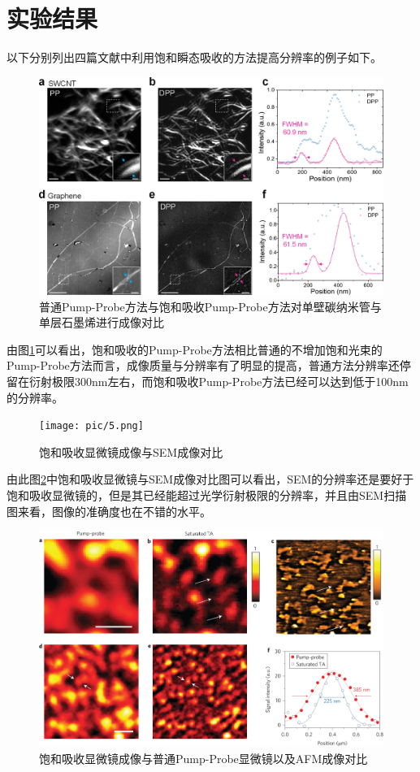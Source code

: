 \documentclass{phyasgn}\usepackage{nag}
\begin{document}
\section{实验结果}
以下分别列出四篇文献中利用饱和瞬态吸收的方法提高分辨率的例子如下。
\begin{figure}[!h]
	\centering
	\includegraphics[width=.9\linewidth]{pic/4.png}
	\caption[饱和吸收显微镜原理]{普通Pump-Probe方法与饱和吸收Pump-Probe方法对单壁碳纳米管与单层石墨烯进行成像对比\cite{doi:10.1021/acs.nanolett.1c00403}}\vspace{1ex}
	\label{4}
	\end{figure}
    \par 由图\ref{4}可以看出，饱和吸收的Pump-Probe方法相比普通的不增加饱和光束的Pump-Probe方法而言，成像质量与分辨率有了明显的提高，普通方法分辨率还停留在衍射极限300nm左右，而饱和吸收Pump-Probe方法已经可以达到低于100nm的分辨率。
\begin{figure}[!h]
	\centering
	\texttt{[image: pic/5.png]}
	\caption[饱和吸收显微镜原理]{饱和吸收显微镜成像与SEM成像对比\cite{doi:10.1021/acs.nanolett.1c00403}}\vspace{1ex}
	\label{5}
	\end{figure}
    \par 由此图\ref{5}中饱和吸收显微镜与SEM成像对比图可以看出，SEM的分辨率还是要好于饱和吸收显微镜的，但是其已经能超过光学衍射极限的分辨率，并且由SEM扫描图来看，图像的准确度也在不错的水平。
\begin{figure}[!h]
	\centering
	\includegraphics[width=.9\linewidth]{pic/6.png}
	\caption[饱和吸收显微镜原理]{饱和吸收显微镜成像与普通Pump-Probe显微镜以及AFM成像对比\cite{wang2013far}}\vspace{1ex}
	\label{6}
	\end{figure}  
\end{document}
